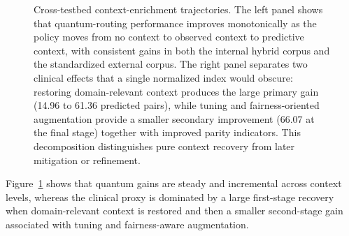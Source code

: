 \documentclass[conference]{IEEEtran}
\begin{document}
\begin{figure}[t]
\caption{Cross-testbed context-enrichment trajectories. The left panel shows that quantum-routing performance improves monotonically as the policy moves from no context to observed context to predictive context, with consistent gains in both the internal hybrid corpus and the standardized external corpus. The right panel separates two clinical effects that a single normalized index would obscure: restoring domain-relevant context produces the large primary gain (14.96 to 61.36 predicted pairs), while tuning and fairness-oriented augmentation provide a smaller secondary improvement (66.07 at the final stage) together with improved parity indicators. This decomposition distinguishes pure context recovery from later mitigation or refinement.}
\label{fig:cross_testbed_context_gain}
\end{figure}

Figure~\ref{fig:cross_testbed_context_gain} shows that quantum gains are steady and incremental across context levels, whereas the clinical proxy is dominated by a large first-stage recovery when domain-relevant context is restored and then a smaller second-stage gain associated with tuning and fairness-aware augmentation.
\end{document}

